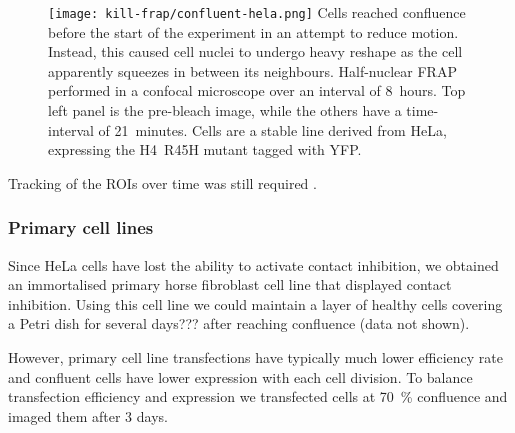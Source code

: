      \begin{figure}
        \centering
        \texttt{[image: kill-frap/confluent-hela.png]}
          {
            Cells reached confluence before the start of the
            experiment in an attempt to reduce motion. Instead, this caused
            cell nuclei to undergo heavy reshape as the cell apparently
            squeezes in between its neighbours. Half-nuclear FRAP performed in
            a confocal microscope over an interval of 8~hours. Top left panel
            is the pre-bleach image, while the others have a time-interval of
            21~minutes. Cells are a stable line derived from HeLa, expressing
            the H4~R45H mutant tagged with YFP.
          }
        \label{fig:kill-frap:confluent-hela}
      \end{figure}

      Tracking of the ROIs over time was still required .

    \subsubsection{Primary cell lines}

      Since HeLa cells have lost the ability to activate contact inhibition, 
	  we obtained an immortalised primary horse fibroblast cell line 
	  that displayed contact inhibition. Using this cell line we could 
	  maintain a layer of healthy cells covering a Petri dish for several days??? 
	  after reaching confluence (data not shown).

      However, primary cell line transfections have typically much lower efficiency rate and 
	  confluent cells have lower expression with each cell division.
	  To balance transfection efficiency and expression we transfected cells at 
	  \SI{70}{\percent} confluence and imaged them after 3 days.

